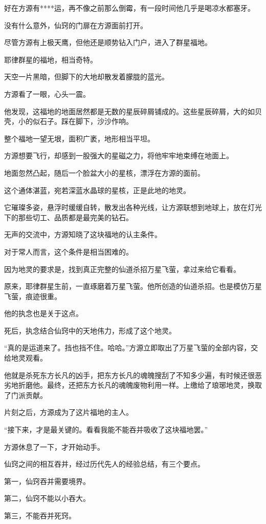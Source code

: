 \begin{this_body}
好在方源有****运，再不像之前那么倒霉，有一段时间他几乎是喝凉水都塞牙。

没有什么意外，仙窍的门扉在方源面前打开。

尽管方源有上极天鹰，但他还是顺势钻入门户，进入了群星福地。

耶律群星的福地，相当奇特。

天空一片黑暗，但脚下的大地却散发着朦胧的蓝光。

方源看了一眼，心头一震。

他发现，这福地的地面居然都是无数的星辰碎屑铺成的。这些星辰碎屑，大的如贝壳，小的似石子。踩在脚下，沙沙作响。

整个福地一望无垠，面积广袤，地形相当平坦。

方源想要飞行，却感到一股强大的星磁之力，将他牢牢地束缚在地面上。

地面忽然凸起，随后一个脸盆大小的星核，漂浮在方源的面前。

这个通体湛蓝，宛若深蓝水晶球的星核，正是此地的地灵。

它璀璨多姿，悬浮时缓缓自转，散发出各种光线，让方源联想到地球上，放在灯光下的那些切工、品质都是最完美的钻石。

无声的交流中，方源知晓了这块福地的认主条件。

对于常人而言，这个条件是相当困难的。

因为地灵的要求是，找到真正完整的仙道杀招万星飞萤，拿过来给它看看。

原来，耶律群星生前，一直琢磨着万星飞萤。他所创造的仙道杀招。也是模仿万星飞萤，痕迹很重。

他的执念也是关于这点。

死后，执念结合仙窍中的天地伟力，形成了这个地灵。

“真的是运道来了。挡也挡不住。哈哈。”方源立即取出了万星飞萤的全部内容，交给地灵观看。

他就是杀死东方长凡的凶手，把东方长凡的魂魄搜刮了不知多少遍，有时候还很恶劣地折磨他。最终，还把东方长凡的魂魄废物利用一样。上缴给了琅琊地灵，换取了门派贡献。

片刻之后，方源成为了这片福地的主人。

“接下来，才是最关键的。看看我能不能吞并吸收了这块福地罢。”

方源休息了一下，才开始动手。

仙窍之间的相互吞并，经过历代先人的经验总结，有三个要点。

第一，仙窍吞并需要境界。

第二，仙窍不能以小吞大。

第三，不能吞并死窍。


\end{this_body}
